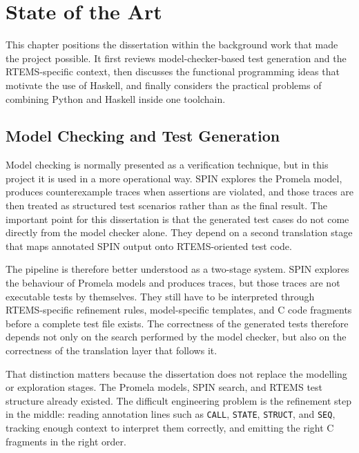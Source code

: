 \chapter{State of the Art}
\label{chap:StateOfTheArt}


This chapter positions the dissertation within the background work that
made the project possible. It first reviews model-checker-based test
generation and the RTEMS-specific context, then discusses the
functional programming ideas that motivate the use of Haskell, and
finally considers the practical problems of combining Python and
Haskell inside one toolchain.

\section{Model Checking and Test Generation}

Model checking is normally presented as a verification technique, but
in this project it is used in a more operational way. SPIN explores
the Promela model, produces counterexample traces when assertions are
violated, and those traces are then treated as structured test
scenarios rather than as the final result. The important point for
this dissertation is that the generated test cases do not come
directly from the model checker alone. They depend on a second
translation stage that maps annotated SPIN output onto RTEMS-oriented
test code.

The pipeline is therefore better understood as a two-stage system.
SPIN explores the behaviour of Promela models and produces traces, but
those traces are not executable tests by themselves. They still have
to be interpreted through RTEMS-specific refinement rules,
model-specific templates, and C code fragments before a complete test
file exists. The correctness of the generated tests therefore depends
not only on the search performed by the model checker, but also on the
correctness of the translation layer that follows it.

That distinction matters because the dissertation does not replace the modelling or exploration stages. The Promela models, SPIN search, and RTEMS test structure already existed. The difficult engineering problem is the refinement step in the middle: reading annotation lines such as \texttt{CALL}, \texttt{STATE}, \texttt{STRUCT}, and \texttt{SEQ}, tracking enough context to interpret them correctly, and emitting the right C fragments in the right order.

